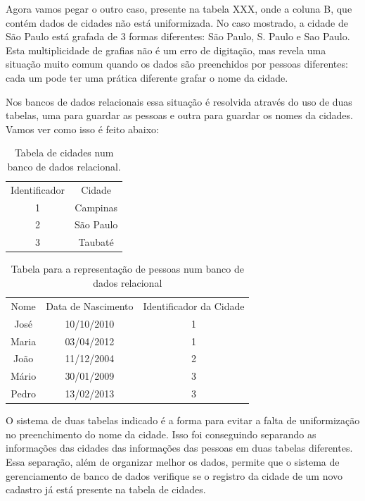 \documentclass[
12pt,		%
openright,	%
twoside,  %
a4paper,			%
chapter=TITLE,		%
english,			%
french,				%
spanish,			%
brazil				%
]{USPSC-classe/USPSC}
\begin{document}
Agora vamos pegar o outro caso, presente na tabela XXX, onde a coluna B, que cont\'em dados de cidades n\~ao est\'a uniformizada. No caso mostrado, a cidade de S\~ao Paulo est\'a grafada de 3 formas diferentes: S\~ao Paulo, S. Paulo e Sao Paulo. Esta multiplicidade de grafias n\~ao \'e um erro de digita\c{c}\~ao, mas revela uma situa\c{c}\~ao muito comum quando os dados s\~ao preenchidos por pessoas diferentes: cada um pode ter uma pr\'atica diferente grafar o nome da cidade.


Nos bancos de dados relacionais essa situa\c{c}\~ao \'e resolvida atrav\'es do uso de duas tabelas, uma para guardar as pessoas e outra para guardar os nomes da cidades. Vamos ver como isso \'e feito abaixo:






\begin{table}[htb]
\tiny
\caption{\label{e4d91173469576e32f3571663aaeb94e34415b3e}Tabela de cidades num banco de dados relacional.}

\centering
\begin{tabular}{|c|c|}
\hline
Identificador  &  Cidade \\
1  &  Campinas \\
2  &  S\~ao Paulo \\
3  &  Taubat\'e \\
\hline
\end{tabular}
\end{table}






\begin{table}[htb]
\tiny
\caption{\label{559b867b37e81cc1a5e7621bf9c9ed9b847f27fc}Tabela para a representa\c{c}\~ao de pessoas num banco de dados relacional}

\centering
\begin{tabular}{|c|c|c|}
\hline
Nome  &  Data de Nascimento  &  Identificador da Cidade \\
Jos\'e  &  10/10/2010  &  1 \\
Maria  & 03/04/2012  &  1 \\
Jo\~ao  &  11/12/2004  &  2 \\
M\'ario  & 30/01/2009  &  3 \\
Pedro  & 13/02/2013  &  3 \\
\hline
\end{tabular}
\end{table}


O sistema de duas tabelas indicado \'e a forma para evitar a falta de uniformiza\c{c}\~ao no preenchimento do nome da cidade. Isso foi conseguindo separando as informa\c{c}\~oes das cidades das informa\c{c}\~oes das pessoas em duas tabelas diferentes. Essa separa\c{c}\~ao, al\'em de organizar melhor os dados, permite que o sistema de gerenciamento de banco de dados verifique se o registro da cidade de um novo cadastro j\'a est\'a presente na tabela de cidades.
\end{document}
